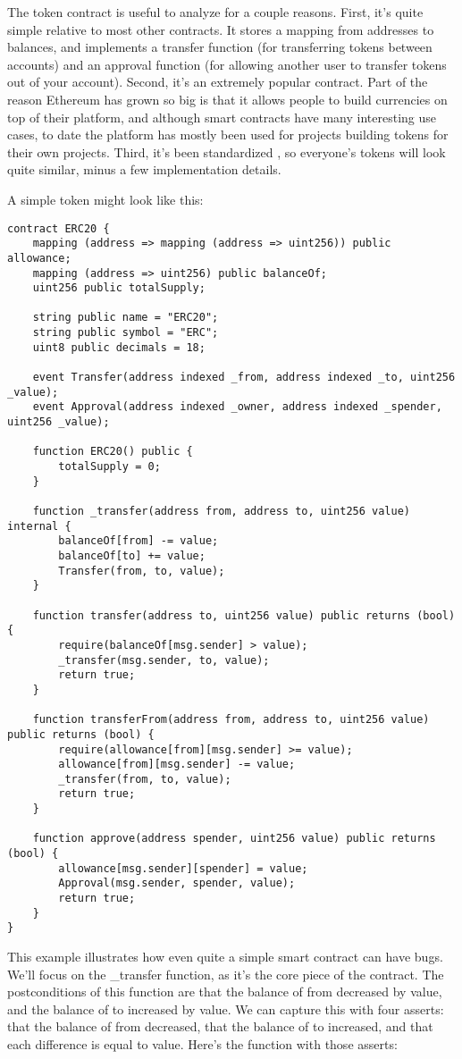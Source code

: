 \documentclass[acmsmall]{acmart}\settopmatter{}
\begin{document}
The token contract is useful to analyze for a couple reasons. First, it's quite simple relative to most other contracts. It stores a mapping from addresses to balances, and implements a transfer function (for transferring tokens between accounts) and an approval function (for allowing another user to transfer tokens out of your account). Second, it's an extremely popular contract. Part of the reason Ethereum has grown so big is that it allows people to build currencies on top of their platform, and although smart contracts have many interesting use cases, to date the platform has mostly been used for projects building tokens for their own projects. Third, it's been standardized \cite{erc20}, so everyone's tokens will look quite similar, minus a few implementation details.

A simple token might look like this:

\begin{verbatim}
contract ERC20 {
	mapping (address => mapping (address => uint256)) public allowance;
	mapping (address => uint256) public balanceOf;
	uint256 public totalSupply;

	string public name = "ERC20";
	string public symbol = "ERC";
	uint8 public decimals = 18;

	event Transfer(address indexed _from, address indexed _to, uint256 _value);
	event Approval(address indexed _owner, address indexed _spender, uint256 _value);

	function ERC20() public {
		totalSupply = 0;
	}

	function _transfer(address from, address to, uint256 value) internal {
		balanceOf[from] -= value;
		balanceOf[to] += value;
		Transfer(from, to, value);
	}

	function transfer(address to, uint256 value) public returns (bool) {
		require(balanceOf[msg.sender] > value);
		_transfer(msg.sender, to, value);
		return true;
	}

	function transferFrom(address from, address to, uint256 value) public returns (bool) {
		require(allowance[from][msg.sender] >= value);
		allowance[from][msg.sender] -= value;
		_transfer(from, to, value);
		return true;
	}

	function approve(address spender, uint256 value) public returns (bool) {
		allowance[msg.sender][spender] = value;
		Approval(msg.sender, spender, value);
		return true;
	}
}

\end{verbatim}

This example illustrates how even quite a simple smart contract can have bugs. We'll focus on the \_transfer function, as it's the core piece of the contract. The postconditions of this function are that the balance of from decreased by value, and the balance of to increased by value. We can capture this with four asserts: that the balance of from decreased, that the balance of to increased, and that each difference is equal to value. Here's the function with those asserts:
\end{document}
